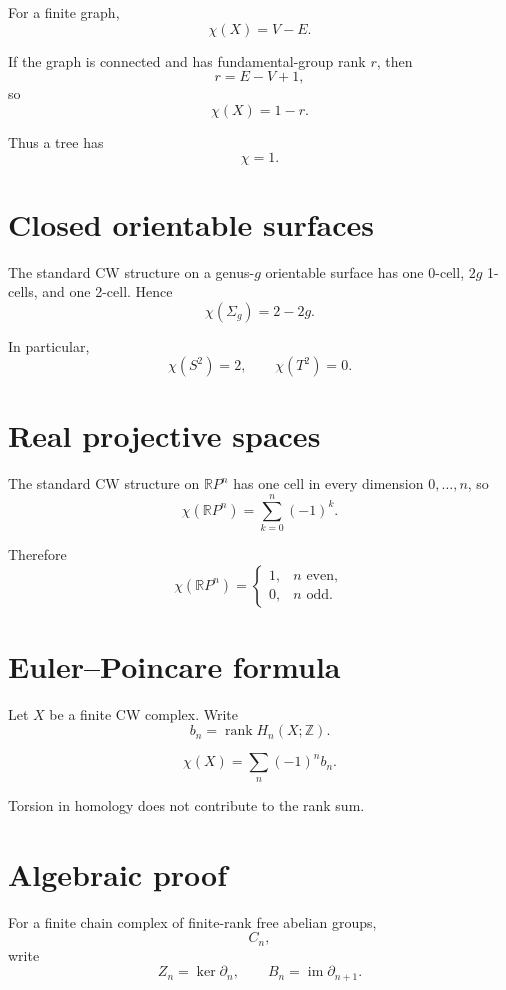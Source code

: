 For a finite graph,
\[
\chi(X)=V-E.
\]

If the graph is connected and has fundamental-group rank \(r\), then
\[
r=E-V+1,
\]
so
\[
\chi(X)=1-r.
\]

Thus a tree has
\[
\chi=1.
\]

\section{Closed orientable surfaces}

The standard CW structure on a genus-\(g\) orientable surface has one
0-cell, \(2g\) 1-cells, and one 2-cell.  Hence
\[
\chi(\Sigma_g)=2-2g.
\]

In particular,
\[
\chi(S^2)=2,
\qquad
\chi(T^2)=0.
\]

\section{Real projective spaces}

The standard CW structure on \(\mathbb RP^n\) has one cell in every dimension
\(0,\dots,n\), so
\[
\chi(\mathbb RP^n)
=
\sum_{k=0}^n(-1)^k.
\]

Therefore
\[
\chi(\mathbb RP^n)=
\begin{cases}
1,&n\text{ even},\\
0,&n\text{ odd}.
\end{cases}
\]

\section{Euler--Poincare formula}

Let \(X\) be a finite CW complex.  Write
\[
b_n=\operatorname{rank}H_n(X;\mathbb Z).
\]

\begin{theorem}
\label{thm:viii21-euler-poincare}
\[
\chi(X)
=
\sum_n(-1)^n b_n.
\]
\end{theorem}

Torsion in homology does not contribute to the rank sum.

\section{Algebraic proof}

For a finite chain complex of finite-rank free abelian groups,
\[
C_n,
\]
write
\[
Z_n=\ker\partial_n,
\qquad
B_n=\operatorname{im}\partial_{n+1}.
\]

